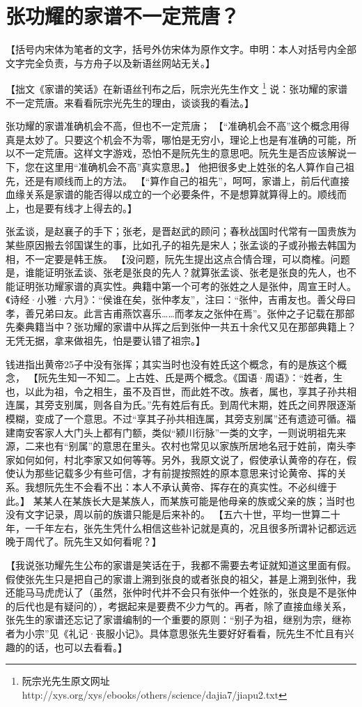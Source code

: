 \section{张功耀的家谱不一定荒唐？}

【括号内宋体为笔者的文字，括号外仿宋体为原作文字。申明：本人对括号内全部文字完全负责，与方舟子以及新语丝网站无关。】


【拙文《家谱的笑话》在新语丝刊布之后，阮宗光先生作文
\footnote{阮宗光先生原文网址 http://xys.org/xys/ebooks/others/science/dajia7/jiapu2.txt}
说：张功耀的家谱不一定荒唐。来看看阮宗光先生的理由，谈谈我的看法。】

\fangsong
张功耀的家谱准确机会不高，但也不一定荒唐；
\normalfont【“准确机会不高”这个概念用得真是太妙了。只要这个机会不为零，哪怕是无穷小，理论上也是有准确的可能，所以不一定荒唐。这样文字游戏，恐怕不是阮先生的意思吧。阮先生是否应该解说一下，您在这里用“准确机会不高”真实意思。】
\fangsong
他把很多史上姓张的名人算作自己祖先，还是有顺线而上的方法。
\normalfont
【“算作自己的祖先”，呵呵，家谱上，前后代直接血缘关系是家谱的能否得以成立的一个必要条件，不是想算就算得上的。顺线而上，也是要有线才上得去的。】

\fangsong
张孟谈，是赵襄子的手下；张老，是晋赵武的顾问；春秋战国时代常有一国贵族为某些原因搬去邻国谋生的事，比如孔子的祖先是宋人；张孟谈的子或孙搬去韩国为相，不一定要是韩王族。
\normalfont
【没问题，阮先生提出这点合情合理，可以商榷。问题是，谁能证明张孟谈、张老是张良的先人？就算张孟谈、张老是张良的先人，也不能证明张功耀家谱的真实性。典籍中第一个可考的张姓之人是张仲，周宣王时人。《诗经·小雅·六月》：“侯谁在矣，张仲孝友”，注曰：“张仲，吉甫友也。善父母曰孝，善兄弟曰友。此言吉甫燕饮喜乐……而孝友之张仲在焉”。张仲之子记载在那部先秦典籍当中？张功耀的家谱中从挥之后到张仲一共五十余代又见在那部典籍上？无凭无据，拿来做祖先，怕是要认错了祖宗。】

\fangsong
钱进指出黄帝25子中没有张挥；其实当时也没有姓氏这个概念，有的是族这个概念，
\normalfont
【阮先生知一不知二。上古姓、氏是两个概念。《国语·周语》：“姓者，生也，以此为祖，令之相生，虽不及百世，而此姓不改。族者，属也，享其子孙共相连属，其旁支别属，则各自为氏。”先有姓后有氏。到周代末期，姓氏之间界限逐渐模糊，变成了一个意思。不过“享其子孙共相连属，其旁支别属”还有遗迹可循。福建南安客家人大门头上都有门额，类似“颍川衍脉”一类的文字，一则说明祖先来源，二来也有“别属”的意思在里头。农村也常见以家族所居地名冠于姓前，南头李家如何如何，村北李家又如何等等。另外，我原文说了，假使承认黄帝的存在，假使认为那些记载多少有些可信，才有前提按照姓的原本意思来讨论黄帝、挥的关系。我想阮先生不会看不出：本人不承认黄帝、挥存在的真实性。不必纠缠于此。】
\fangsong
某某人在某族长大是某族人，而某族可能是他母亲的族或父亲的族；当时也没有文字记录，周以前的族谱只能是后来补的。
\normalfont
【五六十世，平均一世算二十年，一千年左右，张先生凭什么相信这些补记就是真的，况且很多所谓补记都远远晚于周代了。阮先生又如何看呢？】

【我说张功耀先生公布的家谱是笑话在于，我都不需要去考证就知道这里面有假。假使张先生只是把自己的家谱上溯到张良的或者张良的祖父，甚是上溯到张仲，我还能马马虎虎认了（虽然，张仲时代并不会只有张仲一个姓张的，张良是不是张仲的后代也是有疑问的），考据起来是要费不少力气的。再者，除了直接血缘关系，张先生的家谱还忘记了家谱编制的一个重要的原则：“别子为祖，继别为宗，继祢者为小宗”见《礼记·丧服小记》。具体意思张先生要好好看看，阮先生不忙且有兴趣的的话，也可以去看看。】